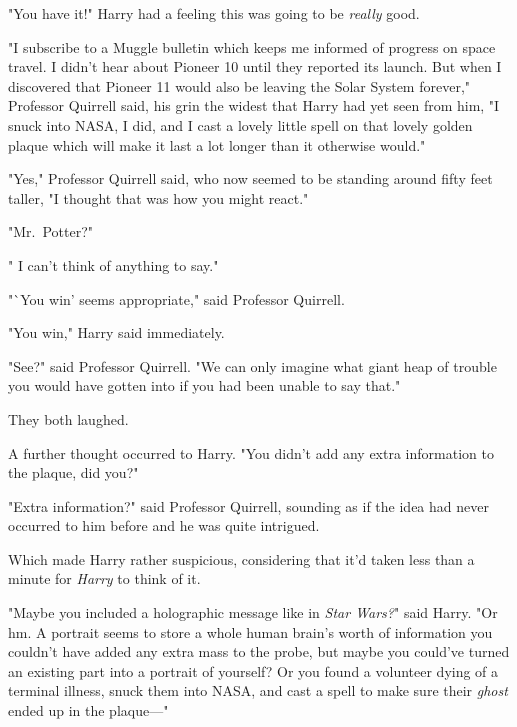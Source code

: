 "You have it!" Harry had a feeling this was going to be \emph{really} good.

"I subscribe to a Muggle bulletin which keeps me informed of progress on space
travel. I didn't hear about Pioneer 10 until they reported its launch. But when
I discovered that Pioneer 11 would also be leaving the Solar System forever,"
Professor Quirrell said, his grin the widest that Harry had yet seen from him,
"I snuck into NASA, I did, and I cast a lovely little spell on that lovely
golden plaque which will make it last a lot longer than it otherwise would."

{\el}

{\el}

{\el}

"Yes," Professor Quirrell said, who now seemed to be standing around fifty feet
taller, "I thought that was how you might react."

{\el}

{\el}

{\el}

"Mr.~Potter?"

"{\el} I can't think of anything to say."

"`You win' seems appropriate," said Professor Quirrell.

"You win," Harry said immediately.

"See?" said Professor Quirrell. "We can only imagine what giant heap of trouble
you would have gotten into if you had been unable to say that."

They both laughed.

A further thought occurred to Harry. "You didn't add any extra information to
the plaque, did you?"

"Extra information?" said Professor Quirrell, sounding as if the idea had never
occurred to him before and he was quite intrigued.

Which made Harry rather suspicious, considering that it'd taken less than a
minute for \emph{Harry} to think of it.

"Maybe you included a holographic message like in \emph{Star Wars?}" said
Harry. "Or{\el} hm. A portrait seems to store a whole human brain's worth of
information{\el} you couldn't have added any extra mass to the probe, but
maybe you could've turned an existing part into a portrait of yourself? Or you
found a volunteer dying of a terminal illness, snuck them into NASA, and cast a
spell to make sure their \emph{ghost} ended up in the plaque\mbox{---}"

